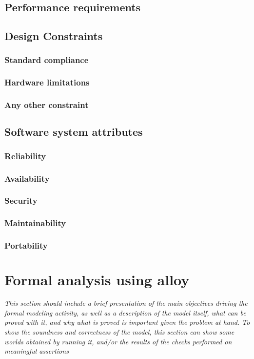 \documentclass{article}
\begin{document}
	\subsection{Performance requirements}
	\subsection{Design Constraints}
		\subsubsection{Standard compliance}
		\subsubsection{Hardware limitations}
		\subsubsection{Any other constraint}
	\subsection{Software system attributes}
		\subsubsection{Reliability}
		\subsubsection{Availability}
		\subsubsection{Security}
		\subsubsection{Maintainability}
		\subsubsection{Portability}
\section{Formal analysis using alloy} \textit{This section should include a brief presentation of the main objectives driving the formal modeling activity, as well as a description of the model itself, what can be proved with it, and why what is proved is important given the problem at hand. To show the soundness and correctness of the model, this section can show some worlds obtained by running it, and/or the results of the checks performed on meaningful assertions}
\end{document}
